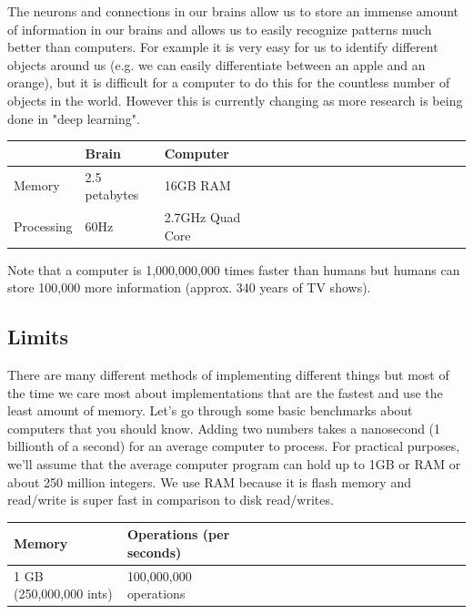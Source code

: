 \documentclass[11pt,oneside]{book}
\begin{document}
The neurons and connections in our brains allow us to store an immense amount of information in our brains and allows us to easily recognize patterns much better than computers. For example it is very easy for us to identify different objects around us (e.g. we can easily differentiate between an apple and an orange), but it is difficult for a computer to do this for the countless number of objects in the world. However this is currently changing as more research is being done in "deep learning".

\vspace{10px}\begin{tabulary}{0.4\linewidth}{|l|l|l|l|l|l|l|l|l|l|l|l|l|l|l|l|l|l|l}\hline


   &
  Brain &
  Computer\\
\hline


  Memory &
  2.5 petabytes &
  16GB RAM\\

  Processing &
  60Hz &
  2.7GHz Quad Core\\

\hline\end{tabulary}

Note that a computer is 1,000,000,000 times faster than humans but humans can store 100,000 more information (approx. 340 years of TV shows).

\subsection{Limits}

There are many different methods of implementing different things but most of the time we care most about implementations that are the fastest and use the least amount of memory. Let's go through some basic benchmarks about computers that you should know. Adding two numbers takes a nanosecond (1 billionth of a second) for an average computer to process. For practical purposes, we'll assume that the average computer program can hold up to 1GB or RAM or about 250 million integers. We use RAM because it is flash memory and read/write is super fast in comparison to disk read/writes.

\vspace{10px}\begin{tabulary}{0.4\linewidth}{|l|l|l|l|l|l|l|l|l|l|l|l|l|l|l|l|l|l|l}\hline


  Memory &
  Operations (per seconds)\\
\hline


  1 GB (250,000,000 ints) &
  100,000,000 operations\\

\hline\end{tabulary}
\end{document}
